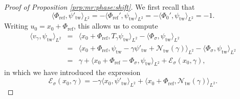 \documentclass[10pt]{articleHJ}
\numberwithin{equation}{section}
\begin{document}
\begin{proof}[Proof of Proposition \ref{prp:mr:phase:shift}]
We first recall that
\begin{equation}
\langle \Phi_{\mathrm{ref}} , \psi'_{\mathrm{tw}} \rangle_{L^2}
= - \langle \Phi_{\mathrm{ref}}' , \psi_{\mathrm{tw}} \rangle_{L^2}
= - \langle \Phi_0' , \psi_{\mathrm{tw}} \rangle_{L^2}
 = -1 .
\end{equation}
Writing $u_0 = x_0 + \Phi_{\mathrm{ref}}$, this allows us to compute
\begin{equation}
\begin{array}{lcl}
\langle v_{\gamma} , \psi_{\mathrm{tw}} \rangle_{L^2}
& = &
    \langle x_0 + \Phi_{\mathrm{ref}} , T_{\gamma} \psi_{\mathrm{tw}} \rangle_{L^2}
  - \langle \Phi_{\sigma} , \psi_{\mathrm{tw}} \rangle_{L^2}
\\[0.2cm]
& = &
\langle x_0 + \Phi_{\mathrm{ref}} ,  \psi_{\mathrm{tw}} - \gamma \psi'_{\mathrm{tw}} + \mathcal{N}_{\mathrm{tw}}(\gamma) \rangle_{L^2}
  - \langle \Phi_{\sigma} , \psi_{\mathrm{tw}} \rangle_{L^2}
\\[0.2cm]
& = & \gamma + \langle x_0 + \Phi_{\mathrm{ref}} - \Phi_{\sigma} , \psi_{\mathrm{tw}} \rangle_{L^2} + \mathcal{E}_{\sigma}( x_0 , \gamma),
\end{array}
\end{equation}
in which we have
introduced the expression
\begin{equation}
\mathcal{E}_{\sigma}(x_0, \gamma)
 = - \gamma \langle x_0, \psi'_{\mathrm{tw}} \rangle_{L^2}
   + \langle x_0 + \Phi_{\mathrm{ref}} , \mathcal{N}_{\mathrm{tw}}(\gamma) \rangle_{L^2}.
\end{equation}


\end{proof}
\end{document}
